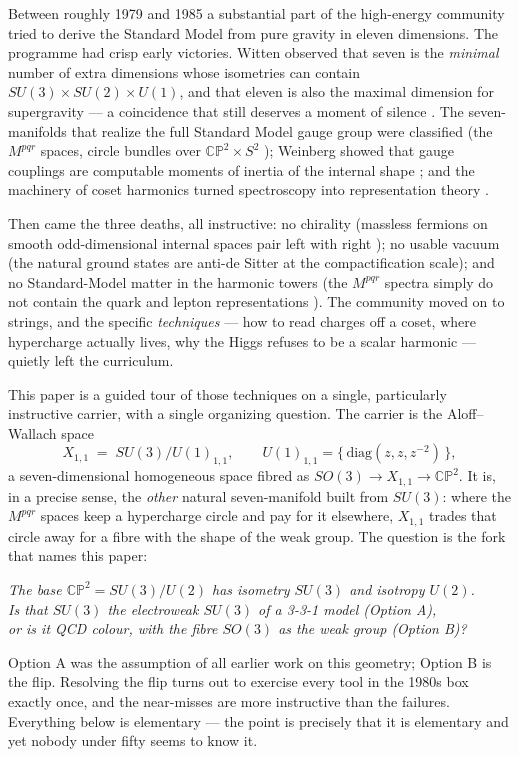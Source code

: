 \documentclass[11pt]{article}
\newcommand{\X}{X_{1,1}}
\newcommand{\CP}{\mathbb{CP}}
\begin{document}
Between roughly 1979 and 1985 a substantial part of the high-energy community tried to derive
the Standard Model from pure gravity in eleven dimensions. The programme had crisp early
victories. Witten observed that seven is the \emph{minimal} number of extra dimensions whose
isometries can contain $SU(3)\times SU(2)\times U(1)$, and that eleven is also the maximal
dimension for supergravity --- a coincidence that still deserves a moment of silence
\cite{Witten81}. The seven-manifolds that realize the full Standard Model gauge group were
classified (the $M^{pqr}$ spaces, circle bundles over $\CP^2\times S^2$
\cite{Witten81,CDF84,FabbriFre99}); Weinberg showed that gauge couplings are computable
moments of inertia of the internal shape \cite{Weinberg83}; and the machinery of coset
harmonics turned spectroscopy into representation theory \cite{SalamStrathdee,DNP86}.

Then came the three deaths, all instructive: no chirality (massless fermions on smooth
odd-dimensional internal spaces pair left with right \cite{Witten81,Witten83}); no usable
vacuum (the natural ground states are anti-de Sitter at the compactification scale); and no
Standard-Model matter in the harmonic towers (the $M^{pqr}$ spectra simply do not contain the
quark and lepton representations \cite{FabbriFre99}). The community moved on to strings, and
the specific \emph{techniques} --- how to read charges off a coset, where hypercharge actually
lives, why the Higgs refuses to be a scalar harmonic --- quietly left the curriculum.

This paper is a guided tour of those techniques on a single, particularly instructive
carrier, with a single organizing question. The carrier is the Aloff--Wallach space
\begin{equation}
\X \;=\; SU(3)/U(1)_{1,1},\qquad U(1)_{1,1}=\{\,\mathrm{diag}(z,z,z^{-2})\,\},
\end{equation}
a seven-dimensional homogeneous space fibred as $SO(3)\to \X\to \CP^2$. It is, in a precise
sense, the \emph{other} natural seven-manifold built from $SU(3)$: where the $M^{pqr}$ spaces
keep a hypercharge circle and pay for it elsewhere, $\X$ trades that circle away for a fibre
with the shape of the weak group. The question is the fork that names this paper:
\begin{center}
\emph{The base $\CP^2=SU(3)/U(2)$ has isometry $SU(3)$ and isotropy $U(2)$.\\
Is that $SU(3)$ the electroweak $SU(3)$ of a 3-3-1 model (Option A),\\
or is it QCD colour, with the fibre $SO(3)$ as the weak group (Option B)?}
\end{center}
Option A was the assumption of all earlier work on this geometry; Option B is the flip.
Resolving the flip turns out to exercise every tool in the 1980s box exactly once, and the
near-misses are more instructive than the failures. Everything below is elementary --- the
point is precisely that it is elementary and yet nobody under fifty seems to know it.
\end{document}
